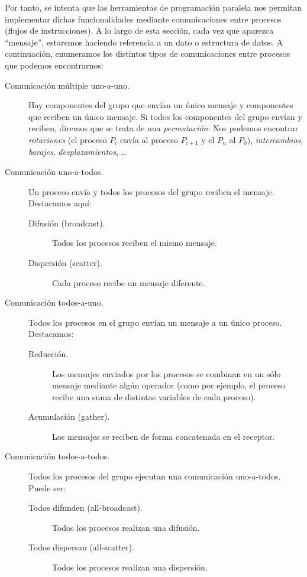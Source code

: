 Por tanto, se intenta que las herramientas de programación paralela nos permitan implementar dichas funcionalidades mediante comunicaciones entre procesos (flujos de instrucciones). A lo largo de esta sección, cada vez que aparezca ``mensaje'', estaremos haciendo referencia a un dato o estructura de datos. A continuación, enumeramos los distintos tipos de comunicaciones entre procesos que podemos encontrarnos:
\begin{description} %
    \item [Comunicación múltiple uno-a-uno.] Hay componentes del grupo que envían un único mensaje y componentes que reciben un único mensaje. Si todos los componentes del grupo envían y reciben, diremos que se trata de una \emph{permutación}. Nos podemos encontrar \emph{rotaciones} (el proceso $P_i$ envía al proceso $P_{i+1}$ y el $P_n$ al $P_0$), \emph{intercambios}, \emph{barajes}, \emph{desplazamientos}, \ldots 

    \item [Comunicación uno-a-todos.] Un proceso envía y todos los procesos del grupo reciben el mensaje. Destacamos aquí:
        \begin{description}
            \item [Difusión (broadcast).] Todos los procesos reciben el mismo mensaje.
            \item [Dispersión (scatter).] Cada proceso recibe un mensaje diferente.
        \end{description}

    \item [Comunicación todos-a-uno.] Todos los procesos en el grupo envían un mensaje a un único proceso. Destacamos:
        \begin{description}
            \item [Reducción.] Los mensajes enviados por los procesos se combinan en un sólo mensaje mediante algún operador (como por ejemplo, el proceso recibe una suma de distintas variables de cada proceso).
            \item [Acumulación (gather).] Los mensajes se reciben de forma concatenada en el receptor.
        \end{description}

    \item [Comunicación todos-a-todos.] Todos los procesos del grupo ejecutan una comunicación uno-a-todos. Puede ser:
        \begin{description}
            \item [Todos difunden (all-broadcast).] Todos los procesos realizan una difusión.
            \item [Todos dispersan (all-scatter).] Todos los procesos realizan una dispersión.
        \end{description}


\end{description}
